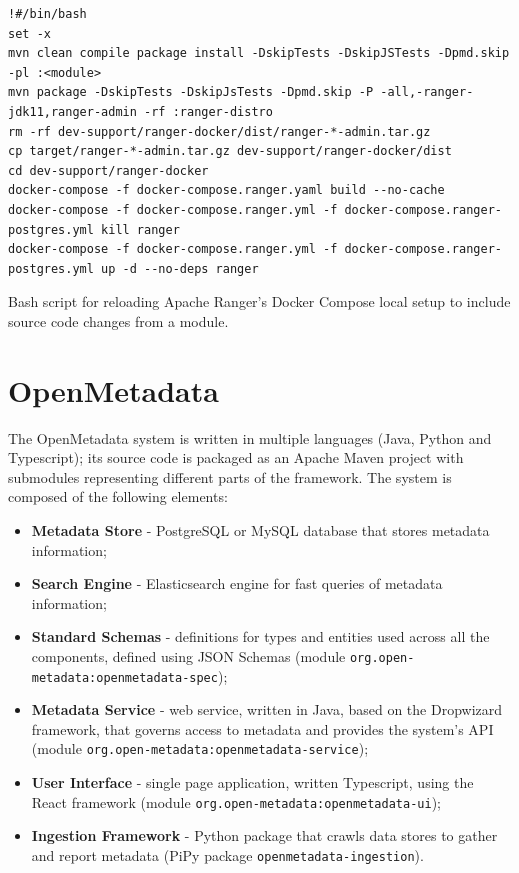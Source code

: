 \begin{listing}
\begin{verbatim}
!#/bin/bash
set -x
mvn clean compile package install -DskipTests -DskipJSTests -Dpmd.skip -pl :<module>
mvn package -DskipTests -DskipJsTests -Dpmd.skip -P -all,-ranger-jdk11,ranger-admin -rf :ranger-distro
rm -rf dev-support/ranger-docker/dist/ranger-*-admin.tar.gz
cp target/ranger-*-admin.tar.gz dev-support/ranger-docker/dist
cd dev-support/ranger-docker
docker-compose -f docker-compose.ranger.yaml build --no-cache
docker-compose -f docker-compose.ranger.yml -f docker-compose.ranger-postgres.yml kill ranger
docker-compose -f docker-compose.ranger.yml -f docker-compose.ranger-postgres.yml up -d --no-deps ranger
\end{verbatim}
\caption{\label{listing:ranger_module_reload_bash} Bash script for reloading Apache Ranger's Docker Compose local setup to include source code changes from a module.}
\end{listing}

\section{OpenMetadata}

The OpenMetadata system is written in multiple languages (Java, Python and Typescript); its source code is packaged as an Apache Maven project with submodules representing different parts of the framework. The system is composed of the following elements:

\begin{itemize}
    \item \textbf{Metadata Store} - PostgreSQL or MySQL database that stores metadata information;
    \item \textbf{Search Engine} - Elasticsearch engine for fast queries of metadata information;
    \item \textbf{Standard Schemas} - definitions for types and entities used across all the components, defined using JSON Schemas (module \texttt{org.open-metadata:openmetadata-spec});  
    \item \textbf{Metadata Service} - web service, written in Java, based on the Dropwizard framework, that governs access to metadata and provides the system's API (module \texttt{org.open-metadata:openmetadata-service});
    \item \textbf{User Interface} - single page application, written Typescript, using the React framework (module \texttt{org.open-metadata:openmetadata-ui});
    \item \textbf{Ingestion Framework} - Python package that crawls data stores to gather and report metadata (PiPy package \texttt{openmetadata-ingestion}).
\end{itemize}

